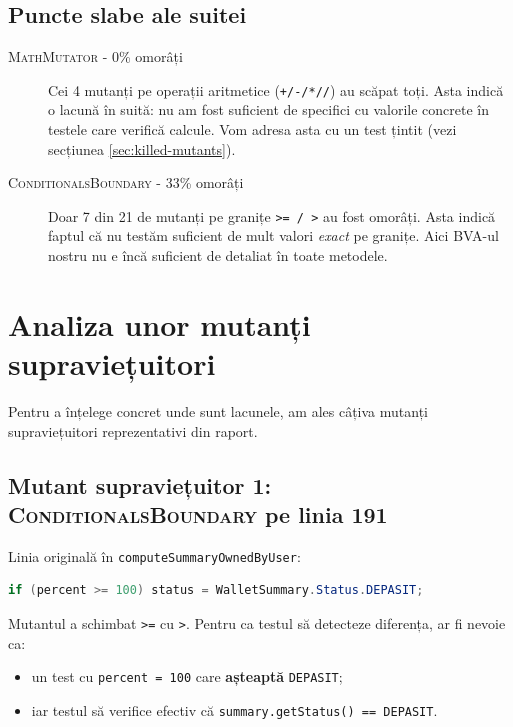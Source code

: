 \subsection{Puncte slabe ale suitei}

\begin{description}
    \item[\textsc{MathMutator} - 0\% omorâți] Cei 4 mutanți pe operații aritmetice (\texttt{+/-/*//}) au scăpat toți. Asta indică o lacună în suită: nu am fost suficient de specifici cu valorile concrete în testele care verifică calcule. Vom adresa asta cu un test țintit (vezi secțiunea \ref{sec:killed-mutants}).

    \item[\textsc{ConditionalsBoundary} - 33\% omorâți] Doar 7 din 21 de mutanți pe granițe \texttt{>= / >} au fost omorâți. Asta indică faptul că nu testăm suficient de mult valori \textit{exact} pe granițe. Aici BVA-ul nostru nu e încă suficient de detaliat în toate metodele.
\end{description}

\section{Analiza unor mutanți supraviețuitori}

Pentru a înțelege concret unde sunt lacunele, am ales câțiva mutanți supraviețuitori reprezentativi din raport.

\subsection{Mutant supraviețuitor 1: \textsc{ConditionalsBoundary} pe linia 191}

Linia originală în \texttt{computeSummaryOwnedByUser}:

\begin{lstlisting}[language=Java]
if (percent >= 100) status = WalletSummary.Status.DEPASIT;
\end{lstlisting}

Mutantul a schimbat \texttt{>=} cu \texttt{>}. Pentru ca testul să detecteze diferența, ar fi nevoie ca:

\begin{itemize}
    \item un test cu \texttt{percent = 100} care \textbf{așteaptă} \texttt{DEPASIT};
    \item iar testul să verifice efectiv că \texttt{summary.getStatus() == DEPASIT}.
\end{itemize}

